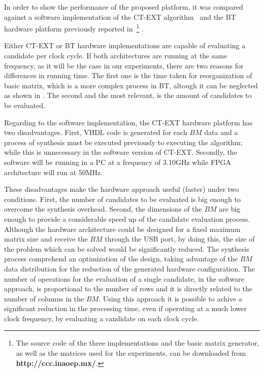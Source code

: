 \documentclass[authoryear,preprint,review,12pt]{elsarticle}
\begin{document}
In order to show the performance of the proposed platform, it was compared against a software 
implementation of the CT-EXT algorithm~\citep{R22} and the BT hardware platform previously 
reported in~\citep{Rod14}\footnote{The source code of the three implementations and the basic matrix
generator, as well as the matrices used for the experiments, can be downloaded from 
\textbf{http://ccc.inaoep.mx/}.} .
 

Either CT-EXT or BT hardware implementations are capable of evaluating a candidate per clock 
cycle. If both architectures are running at the same frequency, as it will be the case in our experiments, 
there are two reasons for differences in running time. The first one is the time taken for reorganization 
of basic matrix, which is a more complex process in BT, altough it can be neglected as shown in \citep{R21}. 
The second and the most relevant, is the amount of candidates to be evaluated. 

Regarding to the software implementation, the CT-EXT hardware platform has two disadvantages. First, 
VHDL code is generated for each $BM$ data and a process of synthesis must be executed previously to 
executing the algorithm; while this is unnecessary in the software version of CT-EXT. Secondly, the 
software will be running in a PC at a frequency of 3.10GHz while FPGA architecture will run at 50MHz. 

These disadvantages make the hardware approach useful (faster) under two conditions. First, the number of 
candidates to be evaluated is big enough to overcome the synthesis overhead. Second, the dimensions of the 
$BM$ are big enough to provide a considerable speed up of the candidate evaluation process. Although 
the hardware architecture could be designed for a fixed maximum matrix size and receive the $BM$ through the 
USB port, by doing this, the size of the problem which can be solved would be significantly reduced. The 
synthesis process comprehend an optimization of the design, taking advantage of the $BM$ data distribution for 
the reduction of the generated hardware configuration. The number of operations for the evaluation of a single 
candidate, in the software approach, is proportional to the number of rows and it is directly related to the 
number of columns in the $BM$. Using this approach it is possible to achive a significant reduction in the processing time, even if
operating at a much lower clock frequency, by evaluating a candidate on each clock cycle.
\end{document}
